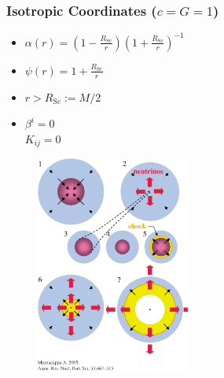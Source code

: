 \documentclass{beamer}
\newcommand{\rsc}{R_{\mathrm{Sc}}}
\begin{document}
\begin{frame}
\frametitle{Isotropic Coordinates ($c=G=1$)}

  \citet{bs2010}\vspace{1em}

  \begin{itemize}[<+->]
    \item[]
      $\alpha\left(r\right)=
      \left(1-\frac{\rsc}{r}\right)\left(1+\frac{\rsc}{r}\right)^{-1}$\\[1em]
    \item[]
      $\psi\left(r\right)=
      1+\frac{\rsc}{r}$\\[1em]
    \item[]
      $r>\rsc:=M/2$\\[1em]
    \item[]
      $\beta^{i}=0$\\[1em]
      $K_{ij}=0$
  \end{itemize}

\end{frame}

\begin{frame}

  \begin{figure}[htb!]
    \centering
    \includegraphics[width=0.45\textwidth]{explosion.jpeg}
  \end{figure}

\end{frame}
\end{document}
